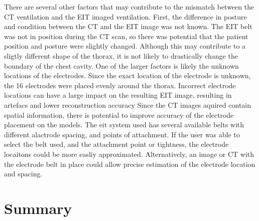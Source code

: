 There are several other factors that may contribute to the mismatch between the 
CT ventilation and the EIT imaged ventilation. 
First, the difference in posture and condition between the CT and the EIT image 
was not known. The EIT belt was not in position during the CT scan, so  there was potential that the
patient position and posture were slightly changed. Although this may contribute to a sligtly different
shape of the thorax, it is not likely to drastically change the boundary of the chest cavity. 
One of the larger factors is likely the unknown locations of the electrodes. Since the exact location 
of the electrode is unknown, the 16 electrodes were placed evenly around the thorax. 
Incorrect electrode locations can have a large impact on the resulting EIT
image, resulting in artefacs and lower reconstruction accuracy \parencite{boyle_impact_2011}
Since the CT images aquired 
contain spatial information, there is potential to improve accuracy of the 
electrode placement on the models. The eit system used has several available belts with 
different alactrode spacing, and points of attachment. If the user was able to select 
the belt used, and the attachment point or tightness, the electrode locaitons could be more easliy 
approximated. Alternatively, an image or CT with the electrode belt in place could allow
precise estimation of the electrode location and spacing. 



\section{Summary}



